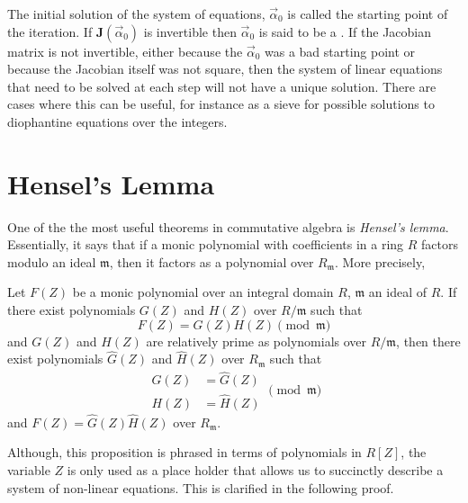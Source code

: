 The initial solution of the system of equations, $\vec{\alpha}_{0}$ is
called the starting point of the iteration.  If
$\mathbf{J}(\vec{\alpha}_0)$ is invertible then $\vec{\alpha}_0$ is said
to be a .  If the Jacobian matrix is not
invertible, either because the $\vec{\alpha}_0$ was a bad starting
point or because the Jacobian itself was not square, then the system
of linear equations that need to be solved at each step will not have a
unique solution.  There are cases where this can be useful, for
instance as a sieve for possible solutions to diophantine 
equations
over the integers.

\section{Hensel's Lemma}
\label{Hensel:Lemma:Sec}

One of the the most useful theorems in commutative algebra is {\em
Hensel's lemma}.  Essentially, it says that if a monic polynomial with
coefficients in a ring $R$ factors modulo an ideal $\mathfrak{m}$, then
it factors as a polynomial over $R_\mathfrak{m}$.  More precisely,

\begin{proposition} \label{Hensel:Lemma:Prop}
Let $F(Z)$ be a monic polynomial over an integral domain $R$,
$\mathfrak{m}$ an ideal of $R$.  If there exist polynomials $G(Z)$ and
$H(Z)$ over $R/\mathfrak{m}$ such that 
\[
F(Z) = G(Z) H(Z) \pmod\mathfrak{m}
\]
and $G(Z)$ and $H(Z)$ are relatively prime as polynomials over
$R/\mathfrak{m}$, then there exist polynomials $\hat{G}(Z)$ and
$\hat{H}(Z)$ over $R_\mathfrak{m}$ such that
\[
\begin{aligned}
G(Z) & = \hat{G}(Z) \\ H(Z) & = \hat{H}(Z)
\end{aligned}
\pmod\mathfrak{m}
\]
and $F(Z) = \hat{G}(Z) \hat{H}(Z)$ over $R_\mathfrak{m}$.
\end{proposition}

Although, this proposition is phrased in terms of polynomials in $R[Z]$, 
the variable $Z$ is only used as a place holder that allows us to 
succinctly describe a system of non-linear equations.  This is clarified 
in the following proof. 

